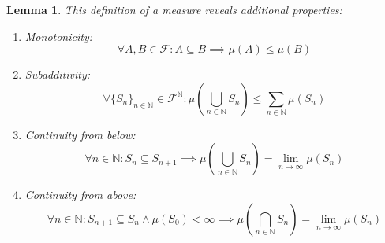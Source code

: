 \documentclass[10pt,letterpaper]{article} %
\newtheorem{lem}{Lemma}[section]
\begin{document}
\begin{lem}
This definition of a measure reveals additional properties:
\begin{enumerate}
\item Monotonicity:
\begin{equation*}
\forall A, B \in \mathcal{F}: A \subseteq B \implies \mu(A) \leqslant \mu(B)
\end{equation*}
\item Subadditivity:
\begin{equation*}
\forall \{S_n\}_{n \in \mathbb{N}} \in \mathcal{F}^\mathbb{N}: \mu\left(\bigcup_{n \in \mathbb{N}}S_n\right) \leqslant \sum_{n \in \mathbb{N}}\mu(S_n)
\end{equation*}
\item Continuity from below:
\begin{equation*}
\forall n \in \mathbb{N}: S_n \subseteq S_{n+1} \implies \mu\left(\bigcup_{n \in \mathbb{N}}S_n\right) = \lim_{n \xrightarrow{} \infty}\mu(S_n)
\end{equation*}
\item Continuity from above:
\begin{equation*}
\forall n \in \mathbb{N}: S_{n+1} \subseteq S_n \land \mu(S_0) < \infty \implies \mu\left(\bigcap_{n \in \mathbb{N}}S_n\right) = \lim_{n \xrightarrow{} \infty}\mu(S_n)
\end{equation*}
\end{enumerate}
\end{lem}
\end{document}
